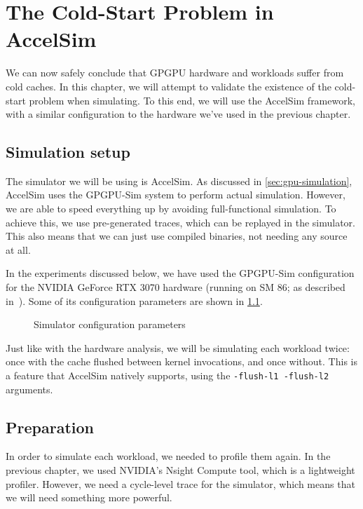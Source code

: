 \chapter{The Cold-Start Problem in AccelSim}\label{ch:sim-analysis}

We can now safely conclude that GPGPU hardware and workloads suffer from cold caches.
In this chapter, we will attempt to validate the existence of the cold-start problem when simulating.
To this end, we will use the AccelSim framework, with a similar configuration to the hardware we've used in the previous chapter.

\section{Simulation setup}\label{sec:simulation-setup}
The simulator we will be using is AccelSim\cite{accelsim}.
As discussed in \cref{sec:gpu-simulation}, AccelSim uses the GPGPU-Sim\cite{gpgpu-sim} system to perform actual simulation.
However, we are able to speed everything up by avoiding full-functional simulation.
To achieve this, we use pre-generated traces, which can be replayed in the simulator.
This also means that we can just use compiled binaries, not needing any source at all.

In the experiments discussed below, we have used the GPGPU-Sim configuration for the NVIDIA GeForce RTX 3070 hardware (running on SM 86; as described in\ \cite{nvidia-wp}).
Some of its configuration parameters are shown in \cref{fig:sim_config}.

\begin{figure}[ht]
    \centering
    
    \caption{Simulator configuration parameters}
    \label{fig:sim_config}
\end{figure}

Just like with the hardware analysis, we will be simulating each workload twice: once with the cache flushed between kernel invocations, and once without.
This is a feature that AccelSim natively supports, using the \verb|-flush-l1 -flush-l2| arguments.

\FloatBarrier
\section{Preparation}\label{sec:preparation}
In order to simulate each workload, we needed to profile them again.
In the previous chapter, we used NVIDIA's Nsight Compute tool, which is a lightweight profiler.
However, we need a cycle-level trace for the simulator, which means that we will need something more powerful.

